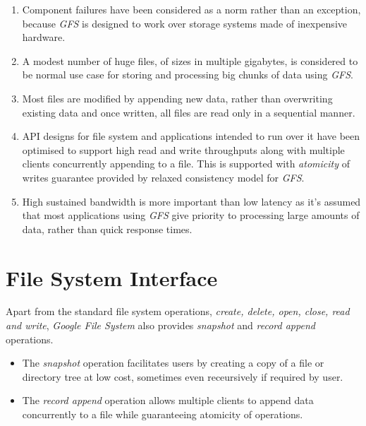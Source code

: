 \documentclass[12pt, a4paper]{article}
\begin{document}
\begin{enumerate}
\item Component failures have been considered as a norm rather than an exception, because \textit{GFS}\cite{Ghemawat:2003:GFS:945445.945450} is designed to work over storage systems made of inexpensive hardware.

\item A modest number of huge files, of sizes in multiple gigabytes, is considered to be normal use case for storing and processing big chunks of data using \textit{GFS}\cite{Ghemawat:2003:GFS:945445.945450}.

\item Most files are modified by appending new data, rather than overwriting existing data and once written, all files are read only in a sequential manner.

\item API designs for file system and applications intended to run over it have been optimised to support high read and write throughputs along with multiple clients concurrently appending to a file. This is supported with \textit{atomicity} of writes guarantee provided by relaxed consistency model for \textit{GFS}\cite{Ghemawat:2003:GFS:945445.945450}.

\item High sustained bandwidth is more important than low latency as it's assumed that most applications using \textit{GFS}\cite{Ghemawat:2003:GFS:945445.945450} give priority to processing large amounts of data, rather than quick response times.
\end{enumerate}

\section*{File System Interface}
Apart from the standard file system operations, \textit{create, delete, open, close, read and write}, \textit{Google File System}\cite{Ghemawat:2003:GFS:945445.945450} also provides \textit{snapshot} and \textit{record append} operations.\par

\begin{itemize}
\item The \textit{snapshot} operation facilitates users by creating a copy of a file or directory tree at low cost, sometimes even receursively if required by user.

\item The \textit{record append} operation allows multiple clients to append data concurrently to a file while guaranteeing atomicity of operations.
\end{itemize}
\end{document}
